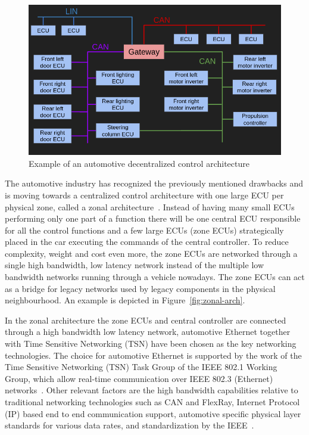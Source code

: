 \begin{figure}[htb]
    \centering
    \includegraphics[width=\textwidth]{images/functional-arch.png}
    \caption{Example of an automotive decentralized control architecture}
    \label{fig:functional-arch}
\end{figure}

The automotive industry has recognized the previously mentioned drawbacks and is moving towards a centralized control architecture with one large ECU per physical zone, called a zonal architecture~\cite{ashjaei2021time}. Instead of having many small ECUs performing only one part of a function there will be one central ECU responsible for all the control functions and a few large ECUs (zone ECUs) strategically placed in the car executing the commands of the central controller. To reduce complexity, weight and cost even more, the zone ECUs are networked through a single high bandwidth, low latency network instead of the multiple low bandwidth networks running through a vehicle nowadays. The zone ECUs can act as a bridge for legacy networks used by legacy components in the physical neighbourhood. An example is depicted in Figure~\ref{fig:zonal-arch}.

In the zonal architecture the zone ECUs and central controller are connected through a high bandwidth low latency network, automotive Ethernet together with Time Sensitive Networking (TSN) have been chosen as the key networking technologies. The choice for automotive Ethernet is supported by the work of the Time Sensitive Networking (TSN) Task Group of the IEEE 802.1 Working Group, which allow real-time communication over IEEE 802.3 (Ethernet) networks~\cite{klaus2019zonal}. Other relevant factors are the high bandwidth capabilities relative to traditional networking technologies such as CAN and FlexRay, Internet Protocol (IP) based end to end communication support, automotive specific physical layer standards for various data rates, and standardization by the IEEE~\cite{ashjaei2021time}.

